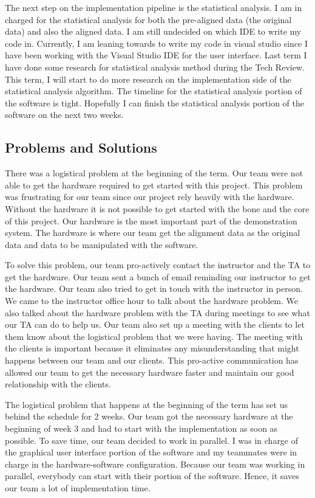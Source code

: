 The next step on the implementation pipeline is the statistical analysis. I am in charged for the statistical analysis for both the pre-aligned data (the original data) and also the aligned data. I am still undecided on which IDE to write my code in. Currently, I am leaning towards to write my code in visual studio since I have been working with the Visual Studio IDE for the user interface. Last term I have done some research for statistical analysis method during the Tech Review. This term, I will start to do more research on the implementation side of the statistical analysis algorithm. The timeline for the statistical analysis portion of the software is tight. Hopefully I can finish the statistical analysis portion of the software on the next two weeks. 

\subsection{Problems and Solutions}
There was a logistical problem at the beginning of the term. Our team were not able to get the hardware required to get started with this project. This problem was frustrating for our team since our project rely heavily with the hardware. Without the hardware it is not possible to get started with the bone and the core of this project. Our hardware is the most important part of the demonstration system. The hardware is where our team get the alignment data as the original data and data to be manipulated with the software.

To solve this problem, our team pro-actively contact the instructor and the TA to get the hardware. Our team sent a bunch of email reminding our instructor to get the hardware. Our team also tried to get in touch with the instructor in person. We came to the instructor office hour to talk about the hardware problem. We also talked about the hardware problem with the TA during meetings to see what our TA can do to help us. Our team also set up a meeting with the clients to let them know about the logistical problem that we were having. The meeting with the clients is important because it eliminates any misunderstanding that might happens between our team and our clients. This pro-active communication has allowed our team to get the necessary hardware faster and maintain our good relationship with the clients. 

The logistical problem that happens at the beginning of the term has set us behind the schedule for 2 weeks. Our team got the necessary hardware at the beginning of week 3 and had to start with the implementation as soon as possible. To save time, our team decided to work in parallel. I was in charge of the graphical user interface portion of the software and my teammates were in charge in the hardware-software configuration. Because our team was working in parallel, everybody can start with their portion of the software. Hence, it saves our team a lot of implementation time. 

